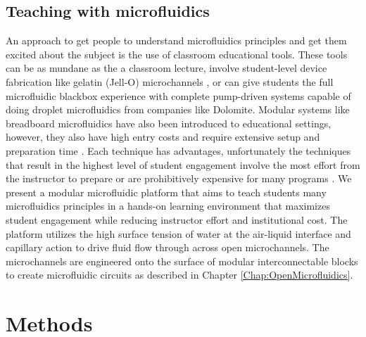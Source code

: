\subsection{Teaching with microfluidics}
An approach to get people to understand microfluidics principles and get them excited about the subject is the use of classroom educational tools. These tools can be as mundane as the a classroom lecture, involve student-level device fabrication like gelatin (Jell-O) microchannels \cite{Yang2010UsingEducation}, or can give students the full microfluidic blackbox experience with complete pump-driven systems capable of doing droplet microfluidics from companies like Dolomite. Modular systems like breadboard microfluidics have also been introduced to educational settings, however, they also have high entry costs and require extensive setup and preparation time \cite{Chen2011, Shaikh2005, Chen2014}. Each technique has advantages, unfortunately the techniques that result in the highest level of student engagement involve the most effort from the instructor to prepare or are prohibitively expensive for many programs \cite{Fintschenko2011Education:Laboratory}. 
We present a modular microfluidic platform that aims to teach students many microfluidics principles in a hands-on learning environment that maximizes student engagement while reducing instructor effort and institutional cost. The platform utilizes the high surface tension of water at the air-liquid interface and capillary action to drive fluid flow through across open microchannels. The microchannels are engineered onto the surface of modular interconnectable blocks to create microfluidic circuits as described in Chapter \ref{Chap:OpenMicrofluidics}.

\section{Methods}

